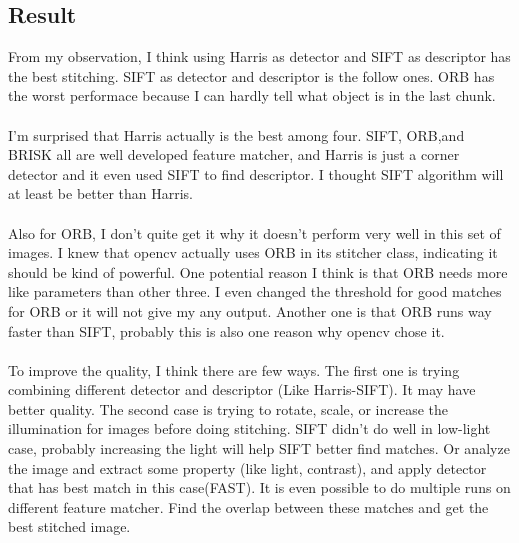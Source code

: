 \documentclass{article}
\begin{document}
\subsection*{Result}
From my observation, I think using Harris as detector and SIFT as descriptor has the best stitching.
SIFT as detector and descriptor is the follow ones. ORB has the worst performace because I can hardly tell what object is in the last chunk.\\
\\
I'm surprised that Harris actually is the best among four.
SIFT, ORB,and BRISK all are well developed feature matcher, and Harris is just a corner detector and it even used SIFT to find descriptor.
I thought SIFT algorithm will at least be better than Harris.\\
\\
Also for ORB, I don't quite get it why it doesn't perform very well in this set of images.
I knew that opencv actually uses ORB in its stitcher class, indicating it should be kind of powerful.
One potential reason I think is that ORB needs more like parameters than other three.
I even changed the threshold for good matches for ORB or it will not give my any output.
Another one is that ORB runs way faster than SIFT, probably this is also one reason why opencv chose it.\\
\\
To improve the quality, I think there are few ways.
The first one is trying combining different detector and descriptor (Like Harris-SIFT). It may have better quality.
The second case is trying to rotate, scale, or increase the illumination for images before doing stitching.
SIFT didn't do well in low-light case, probably increasing the light will help SIFT better find matches.
Or analyze the image and extract some property (like light, contrast), and apply detector that has best match in this case(FAST).
It is even possible to do multiple runs on different feature matcher.
Find the overlap between these matches and get the best stitched image.
\end{document}
